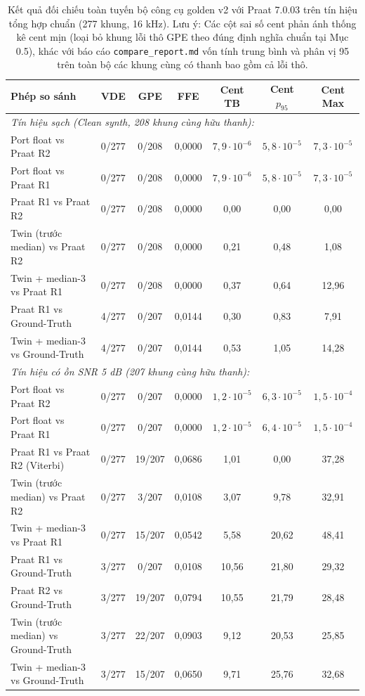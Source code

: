 \begin{table}[H]
\centering
\small
\caption{Kết quả đối chiếu toàn tuyến bộ công cụ golden v2 với Praat 7.0.03 trên tín hiệu tổng hợp chuẩn (277 khung, 16 kHz). Lưu ý: Các cột sai số cent phản ánh thống kê cent mịn (loại bỏ khung lỗi thô GPE theo đúng định nghĩa chuẩn tại Mục 0.5), khác với báo cáo \texttt{compare\_report.md} vốn tính trung bình và phân vị 95 trên toàn bộ các khung cùng có thanh bao gồm cả lỗi thô.}
\label{tab:ch00_golden_results}
\begin{tabular}{lcccccc}
\toprule
\textbf{Phép so sánh} & \textbf{VDE} & \textbf{GPE} & \textbf{FFE} & \textbf{Cent TB} & \textbf{Cent $p_{95}$} & \textbf{Cent Max} \\
\midrule
\multicolumn{7}{l}{\textit{Tín hiệu sạch (Clean synth, 208 khung cùng hữu thanh):}} \\
Port float vs Praat R2 & 0/277 & 0/208 & 0,0000 & $7{,}9 \cdot 10^{-6}$ & $5{,}8 \cdot 10^{-5}$ & $7{,}3 \cdot 10^{-5}$ \\
Port float vs Praat R1 & 0/277 & 0/208 & 0,0000 & $7{,}9 \cdot 10^{-6}$ & $5{,}8 \cdot 10^{-5}$ & $7{,}3 \cdot 10^{-5}$ \\
Praat R1 vs Praat R2 & 0/277 & 0/208 & 0,0000 & 0,00 & 0,00 & 0,00 \\
Twin (trước median) vs Praat R2 & 0/277 & 0/208 & 0,0000 & 0,21 & 0,48 & 1,08 \\
Twin + median-3 vs Praat R1 & 0/277 & 0/208 & 0,0000 & 0,37 & 0,64 & 12,96 \\
Praat R1 vs Ground-Truth & 4/277 & 0/207 & 0,0144 & 0,30 & 0,83 & 7,91 \\
Twin + median-3 vs Ground-Truth & 4/277 & 0/207 & 0,0144 & 0,53 & 1,05 & 14,28 \\
\midrule
\multicolumn{7}{l}{\textit{Tín hiệu có ồn SNR 5 dB (207 khung cùng hữu thanh):}} \\
Port float vs Praat R2 & 0/277 & 0/207 & 0,0000 & $1{,}2 \cdot 10^{-5}$ & $6{,}3 \cdot 10^{-5}$ & $1{,}5 \cdot 10^{-4}$ \\
Port float vs Praat R1 & 0/277 & 0/207 & 0,0000 & $1{,}2 \cdot 10^{-5}$ & $6{,}4 \cdot 10^{-5}$ & $1{,}5 \cdot 10^{-4}$ \\
Praat R1 vs Praat R2 (Viterbi) & 0/277 & 19/207 & 0,0686 & 1,01 & 0,00 & 37,28 \\
Twin (trước median) vs Praat R2 & 0/277 & 3/207 & 0,0108 & 3,07 & 9,78 & 32,91 \\
Twin + median-3 vs Praat R1 & 0/277 & 15/207 & 0,0542 & 5,58 & 20,62 & 48,41 \\
Praat R1 vs Ground-Truth & 3/277 & 0/207 & 0,0108 & 10,56 & 21,80 & 29,32 \\
Praat R2 vs Ground-Truth & 3/277 & 19/207 & 0,0794 & 10,55 & 21,79 & 28,48 \\
Twin (trước median) vs Ground-Truth & 3/277 & 22/207 & 0,0903 & 9,12 & 20,53 & 25,85 \\
Twin + median-3 vs Ground-Truth & 3/277 & 15/207 & 0,0650 & 9,71 & 25,76 & 32,68 \\
\bottomrule
\end{tabular}
\end{table}

